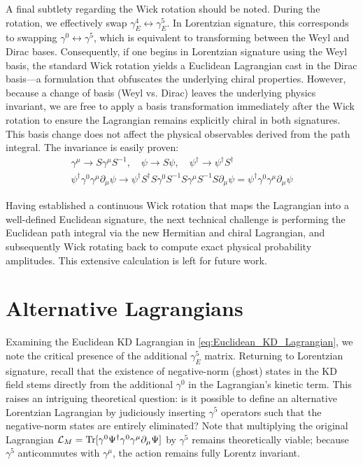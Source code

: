 A final subtlety regarding the Wick rotation should be noted. During the rotation, we effectively swap $\gamma^4_E \leftrightarrow \gamma_E^5$. In Lorentzian signature, this corresponds to swapping $\gamma^0 \leftrightarrow \gamma^5$, which is equivalent to transforming between the Weyl and Dirac bases. Consequently, if one begins in Lorentzian signature using the Weyl basis, the standard Wick rotation yields a Euclidean Lagrangian cast in the Dirac basis—a formulation that obfuscates the underlying chiral properties. However, because a change of basis (Weyl vs. Dirac) leaves the underlying physics invariant, we are free to apply a basis transformation immediately after the Wick rotation to ensure the Lagrangian remains explicitly chiral in both signatures. This basis change does not affect the physical observables derived from the path integral. The invariance is easily proven:
\begin{equation}
\begin{aligned}
    \gamma^\mu\to S\gamma^\mu S^{-1}, \quad \psi\to S\psi , \quad \psi^\dagger\to \psi^\dagger S^\dagger\\
    \psi^\dagger \gamma^0\gamma^\mu\partial_\mu \psi\to \psi^\dagger S^\dagger S\gamma^0 S^{-1} S\gamma^\mu S^{-1}S\partial_\mu \psi=\psi^\dagger \gamma^0\gamma^\mu\partial_\mu \psi
\end{aligned}
\end{equation}

Having established a continuous Wick rotation that maps the Lagrangian into a well-defined Euclidean signature, the next technical challenge is performing the Euclidean path integral via the new Hermitian and chiral Lagrangian, and subsequently Wick rotating back to compute exact physical probability amplitudes. This extensive calculation is left for future work.


\section{Alternative Lagrangians}\label{sec:diff_Lagrangian}

Examining the Euclidean KD Lagrangian in \cref{eq:Euclidean_KD_Lagrangian}, we note the critical presence of the additional $\gamma_E^5$ matrix. Returning to Lorentzian signature, recall that the existence of negative-norm (ghost) states in the KD field stems directly from the additional $\gamma^0$ in the Lagrangian's kinetic term. This raises an intriguing theoretical question: is it possible to define an alternative Lorentzian Lagrangian by judiciously inserting $\gamma^5$ operators such that the negative-norm states are entirely eliminated? Note that multiplying the original Lagrangian $\mathcal{L}_M={\rm Tr}[\gamma^0 \Psi^\dagger \gamma^0\gamma^\mu\partial_\mu\Psi]$ by $\gamma^5$ remains theoretically viable; because $\gamma^5$ anticommutes with $\gamma^\mu$, the action remains fully Lorentz invariant.

